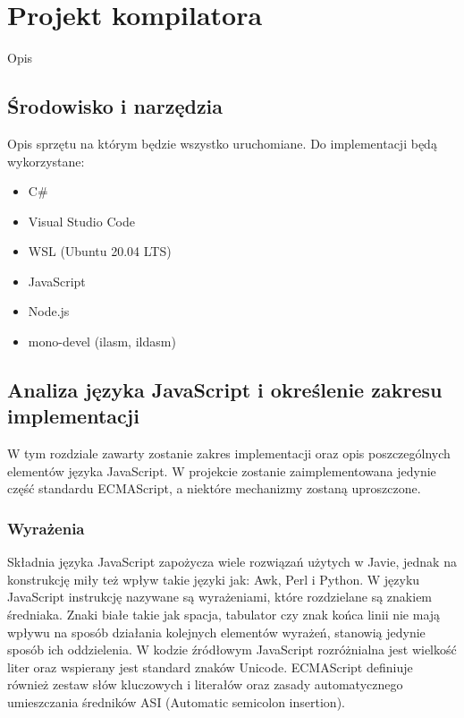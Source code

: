 \chapter{Projekt kompilatora}
\label{rozdzial2}
Opis 
\section{Środowisko i narzędzia}
Opis sprzętu na którym będzie wszystko uruchomiane.
Do implementacji będą wykorzystane:

\begin{itemize}
  \item C\#
  \item Visual Studio Code
  \item WSL (Ubuntu 20.04 LTS)
  \item JavaScript
  \item Node.js
  \item mono-devel (ilasm, ildasm)
\end{itemize}

\section{Analiza języka JavaScript i określenie zakresu implementacji}

\par W tym rozdziale zawarty zostanie zakres implementacji oraz opis poszczególnych elementów języka JavaScript. W projekcie zostanie zaimplementowana jedynie część standardu ECMAScript, a niektóre mechanizmy zostaną uproszczone.


\subsection{Wyrażenia}

\par Składnia języka JavaScript zapożycza wiele rozwiązań użytych w Javie, jednak na konstrukcję miły też wpływ takie języki jak: Awk, Perl i Python. W języku JavaScript instrukcję nazywane są wyrażeniami, które rozdzielane są znakiem średniaka. Znaki białe takie jak spacja, tabulator czy znak końca linii nie mają wpływu na sposób działania kolejnych elementów wyrażeń, stanowią jedynie sposób ich oddzielenia. W kodzie źródłowym JavaScript rozróżnialna jest wielkość liter oraz wspierany jest standard znaków Unicode. ECMAScript definiuje również zestaw słów kluczowych i literałów oraz zasady automatycznego umieszczania średników ASI (Automatic semicolon insertion).

